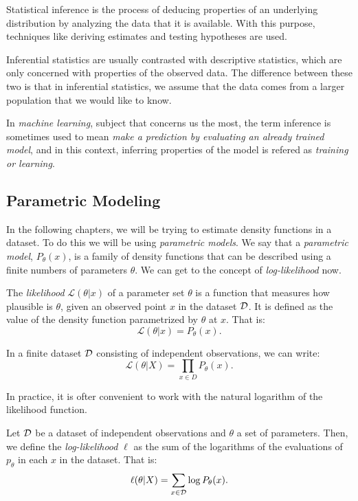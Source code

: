 Statistical inference is the process of deducing properties of an underlying distribution by analyzing the data that it is available. With this purpose, techniques like deriving estimates and testing hypotheses are used. 

Inferential statistics are usually contrasted with descriptive statistics, which are only concerned with properties of the observed data. The difference between these two is that in inferential statistics, we assume that the data comes from a larger
population that we would like to know.

In \emph{machine learning}, subject that concerns us the most, the term inference is sometimes used to mean \emph{make a prediction by evaluating an already trained model}, and in this context, inferring properties of the model is refered as \emph{training or learning}.

\subsection{Parametric Modeling}

In the following chapters, we will be trying to estimate density functions in a dataset. To do this we will be using \emph{parametric models}. We say that a \emph{parametric model}, $P_\theta(x)$, 
is a family of density functions that can be described using a finite numbers of parameters $\theta$. We can get to the concept of \emph{log-likelihood} now.

\begin{ndef}
The \emph{likelihood} $\mathcal L(\theta | x)$ of a parameter set $\theta$ is a function that measures how plausible is $\theta$, given an observed point $x$ in the dataset $\mathcal{D}$. It is defined as the value of the 
density function parametrized by $\theta$ at $x$. That is:
$$
\mathcal L(\theta|x) = P_\theta(x).
$$
\end{ndef}

In a finite dataset $\mathcal{D}$ consisting of independent observations, we can write:
\[
\mathcal L(\theta | X) = \prod_{x \in D} P_\theta(x).
\]

In practice, it is ofter convenient to work with the natural logarithm of the likelihood function. 

\begin{ndef}
Let $\mathcal{D}$ be a dataset of independent observations and $\theta$ a set of parameters. Then, we define the \emph{log-likelihood} $\ell$ as the sum of the logarithms of the evaluations of $p_\theta$ in each $x$ in the dataset. That is:
\[
\ell (\theta | X) = \sum_{x \in \mathcal{D}} \log P_\theta(x).
\]
\end{ndef}

